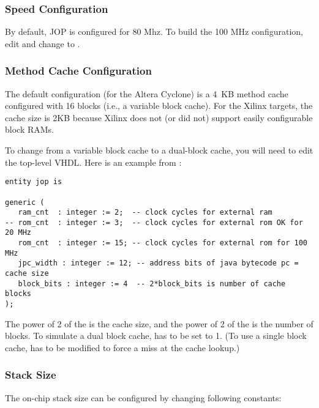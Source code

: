 \subsubsection{Speed Configuration}


By default, JOP is configured for 80 Mhz. To build the 100 MHz
configuration, edit  and change
 to .

\subsubsection{Method Cache Configuration}


The default configuration (for the Altera Cyclone) is a 4~KB method
cache configured with 16 blocks (i.e., a variable block cache). For
the Xilinx targets, the cache size is 2KB because Xilinx does not (or
did not) support easily configurable block RAMs.

To change from a variable block cache to a dual-block cache, you will
need to edit the top-level VHDL. Here is an example from
:

{\small
\begin{lstlisting}
entity jop is

generic (
   ram_cnt  : integer := 2;  -- clock cycles for external ram
-- rom_cnt  : integer := 3;  -- clock cycles for external rom OK for 20 MHz
   rom_cnt  : integer := 15; -- clock cycles for external rom for 100 MHz
   jpc_width : integer := 12; -- address bits of java bytecode pc = cache size
   block_bits : integer := 4  -- 2*block_bits is number of cache blocks
);
\end{lstlisting}
}

The power of 2 of the  is the cache size, and the
power of 2 of the  is the number of blocks. To
simulate a dual block cache,  has to be set to 1.
(To use a single block cache,  has to be modified to
force a miss at the cache lookup.)

\subsubsection{Stack Size}


The on-chip stack size can be configured by changing following
constants:

